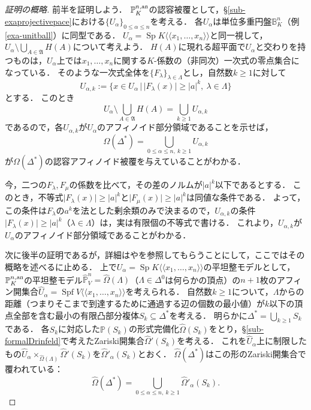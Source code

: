 \documentclass[a4paper,12pt, dvipdfmx]{jsbook}
\def\P{\mathbb{P}}
\def\B{\mathbb{B}}
\def\Spf{\mathop{\mathrm{Spf}}\nolimits}
\def\Sp{\mathop{\mathrm{Sp}}\nolimits}
\def\an{\textsl{an}}
\def\dl{\langle\!\langle}
\def\dr{\rangle\!\rangle}
\newcommand{\abs}[1]{\lvert#1\rvert}
\theoremstyle{plain}
\theoremstyle{definition}
\begin{document}
\begin{proof}[証明の概略]
前半を証明しよう．
$\P^{n,\an}_K$の認容被覆として，\S\ref{sub-exaprojectivepace}における$\{U_{\alpha}\}_{0\leq\alpha\leq n}$を考える．
各$U_{\alpha}$は単位多重円盤$\B^n_K$（例\ref{exa-unitball}）に同型である．
$U_{\alpha}=\Sp K\dl x_1,\ldots,x_n\dr$と同一視して，$U_{\alpha}\setminus\bigcup_{A\in\mathfrak{A}}H(A)$について考えよう．
$H(A)$に現れる超平面で$U_{\alpha}$と交わりを持つものは，$U_{\alpha}$上では$x_1,\ldots,x_n$に関する$K$-係数の（非同次）一次式の零点集合になっている．
そのような一次式全体を$\{F_{\lambda}\}_{\lambda\in\Lambda}$とし，自然数$k\geq 1$に対して
$$
U_{\alpha,k}:=\{x\in U_{\alpha}\,|\,\abs{F_{\lambda}(x)}\geq\abs{a}^k,\ \lambda\in\Lambda\}
$$
とする．
このとき
$$
U_{\alpha}\setminus\bigcup_{A\in\mathfrak{A}}H(A)=\bigcup_{k\geq 1}U_{\alpha,k}
$$
であるので，各$U_{\alpha,k}$が$U_{\alpha}$のアフィノイド部分領域であることを示せば，
$$
\Omega(\Delta^{\ast})=\bigcup_{0\leq\alpha\leq n,\ k\geq 1}U_{\alpha,k}
$$
が$\Omega(\Delta^{\ast})$の認容アフィノイド被覆を与えていることがわかる．

今，二つの$F_{\lambda},F_{\mu}$の係数を比べて，その差のノルムが$\abs{a}^k$以下であるとする．
このとき，不等式$\abs{F_{\lambda}(x)}\geq\abs{a}^k$と$\abs{F_{\mu}(x)}\geq\abs{a}^k$は同値な条件である．
よって，この条件は$F_{\lambda}$の$a^k$を法とした剰余類のみで決まるので，$U_{\alpha,k}$の条件$\abs{F_{\lambda}(x)}\geq\abs{a}^k$（$\lambda\in\Lambda$）は，実は有限個の不等式で書ける．
これより，$U_{\alpha,k}$が$U_{\alpha}$のアフィノイド部分領域であることがわかる．

次に後半の証明であるが，詳細は\cite{Kuri}や\cite{Must}を参照してもらうことにして，ここではその概略を述べるに止める．
上で$U_{\alpha}=\Sp K\dl x_1,\ldots,x_n\dr$の平坦整モデルとして，$\P^{n,\an}_K$の平坦整モデル$\widehat{\P}^n_V=\widehat{\Omega}(\Lambda)$（$\Lambda\in\Delta^0$は何らかの頂点）の$n+1$枚のアフィン開集合$\widehat{U}_{\alpha}=\Spf V\dl x_1,\ldots,x_n\dr$を考えられる．
自然数$k\geq 1$について，$\Lambda$からの距離（つまりそこまで到達するために通過する辺の個数の最小値）が$k$以下の頂点全部を含む最小の有限凸部分複体$S_k\subseteq\Delta^{\ast}$を考える．
明らかに$\Delta^{\ast}=\bigcup_{k\geq 1}S_k$である．
各$S_k$に対応した$\P(S_k)$の形式完備化$\widehat{\Omega}(S_k)$をとり，\S\ref{sub-formalDrinfeld}で考えたZariski開集合$\widehat{\Omega}'(S_k)$を考える．
これを$\widehat{U}_{\alpha}$上に制限したもの$\widehat{U}_{\alpha}\times_{\widehat{\Omega}(\Lambda)}\widehat{\Omega}'(S_k)$を$\widehat{\Omega}'_{\alpha}(S_k)$とおく．
$\widehat{\Omega}(\Delta^{\ast})$はこの形のZariski開集合で覆われている：
$$
\widehat{\Omega}(\Delta^{\ast})=\bigcup_{0\leq\alpha\leq n,\ k\geq 1}\widehat{\Omega}'_{\alpha}(S_k).
$$


\end{proof}
\end{document}
